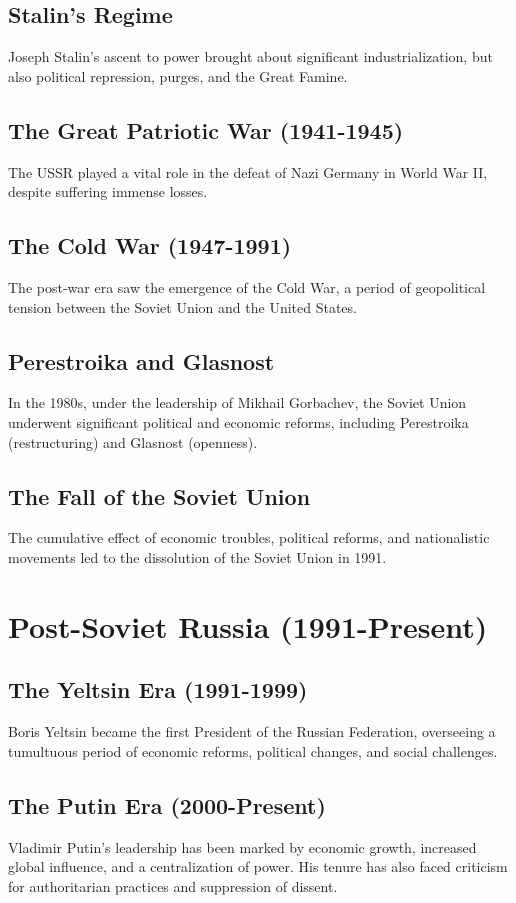 \documentclass[a4paper,12pt]{book}
\begin{document}
\subsection{Stalin’s Regime}
Joseph Stalin’s ascent to power brought about significant industrialization, but also political repression, purges, and the Great Famine.

\subsection{The Great Patriotic War (1941-1945)}
The USSR played a vital role in the defeat of Nazi Germany in World War II, despite suffering immense losses.

\subsection{The Cold War (1947-1991)}
The post-war era saw the emergence of the Cold War, a period of geopolitical tension between the Soviet Union and the United States.

\subsection{Perestroika and Glasnost}
In the 1980s, under the leadership of Mikhail Gorbachev, the Soviet Union underwent significant political and economic reforms, including Perestroika (restructuring) and Glasnost (openness).

\subsection{The Fall of the Soviet Union}
The cumulative effect of economic troubles, political reforms, and nationalistic movements led to the dissolution of the Soviet Union in 1991.

\section{Post-Soviet Russia (1991-Present)}
\label{sec:post-soviet-russia}
\subsection{The Yeltsin Era (1991-1999)}
Boris Yeltsin became the first President of the Russian Federation, overseeing a tumultuous period of economic reforms, political changes, and social challenges.

\subsection{The Putin Era (2000-Present)}
Vladimir Putin’s leadership has been marked by economic growth, increased global influence, and a centralization of power. His tenure has also faced criticism for authoritarian practices and suppression of dissent.
\end{document}

